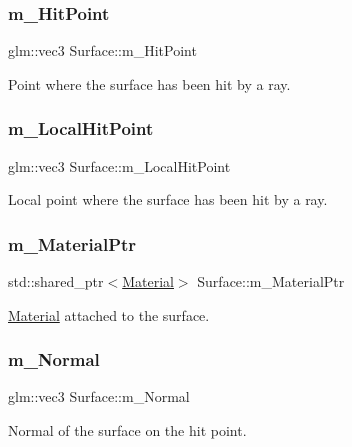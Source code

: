 \subsubsection{\texorpdfstring{m\+\_\+\+Hit\+Point}{m\_HitPoint}}
{\footnotesize\ttfamily glm\+::vec3 Surface\+::m\+\_\+\+Hit\+Point}

Point where the surface has been hit by a ray. \hypertarget{class_surface_ab914f3e5804e0043a140b892e32ab3e7}{}\label{class_surface_ab914f3e5804e0043a140b892e32ab3e7} 
\subsubsection{\texorpdfstring{m\+\_\+\+Local\+Hit\+Point}{m\_LocalHitPoint}}
{\footnotesize\ttfamily glm\+::vec3 Surface\+::m\+\_\+\+Local\+Hit\+Point}

Local point where the surface has been hit by a ray. \hypertarget{class_surface_ac9c3eaa9f8870efbe4cd9e79e28b21e1}{}\label{class_surface_ac9c3eaa9f8870efbe4cd9e79e28b21e1} 
\subsubsection{\texorpdfstring{m\+\_\+\+Material\+Ptr}{m\_MaterialPtr}}
{\footnotesize\ttfamily std\+::shared\+\_\+ptr$<$\hyperlink{class_material}{Material}$>$ Surface\+::m\+\_\+\+Material\+Ptr}

\hyperlink{class_material}{Material} attached to the surface. \hypertarget{class_surface_aa4ae3fc7afb6da10d48beb2bd0590a48}{}\label{class_surface_aa4ae3fc7afb6da10d48beb2bd0590a48} 
\subsubsection{\texorpdfstring{m\+\_\+\+Normal}{m\_Normal}}
{\footnotesize\ttfamily glm\+::vec3 Surface\+::m\+\_\+\+Normal}

Normal of the surface on the hit point. \hypertarget{class_surface_a19719f48b9ee4fb2a78ef277289f0321}{}\label{class_surface_a19719f48b9ee4fb2a78ef277289f0321} 
